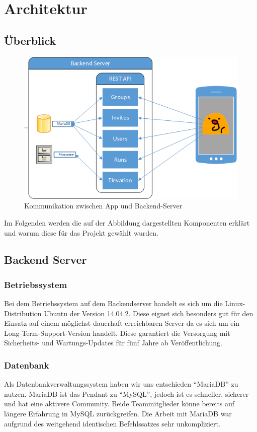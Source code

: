 \section{Architektur}\label{kapitel2}
\subsection{Überblick}
\begin {figure}[htb]
\centering
\includegraphics{abb/network_diagram_visio}
\caption{Kommunikation zwischen App und Backend-Server}
\end{figure}
Im Folgenden werden die auf der Abbildung dargestellten Komponenten erklärt und warum diese für das Projekt gewählt wurden.
\subsection{Backend Server}
\subsubsection{Betriebssystem}
Bei dem Betriebssystem auf dem Backendserver handelt es sich um die Linux-Distribution Ubuntu der Version 14.04.2. Diese eignet sich besonders gut für den Einsatz auf einem möglichst dauerhaft erreichbaren Server da es sich um ein Long-Term-Support-Version handelt. Diese garantiert die Versorgung mit Sicherheits- und Wartungs-Updates für fünf Jahre ab Veröffentlichung.
\subsubsection{Datenbank}
Als Datenbankverwaltungssystem  haben wir uns entschieden ``MariaDB'' zu nutzen. MariaDB ist das Pendant zu ``MySQL'', jedoch ist es schneller, sicherer und hat eine aktivere Community.
Beide Teammitglieder könne bereits auf längere Erfahrung in MySQL zurückgreifen. Die Arbeit mit MariaDB war aufgrund des weitgehend identischen Befehlssatzes sehr unkompliziert. %
